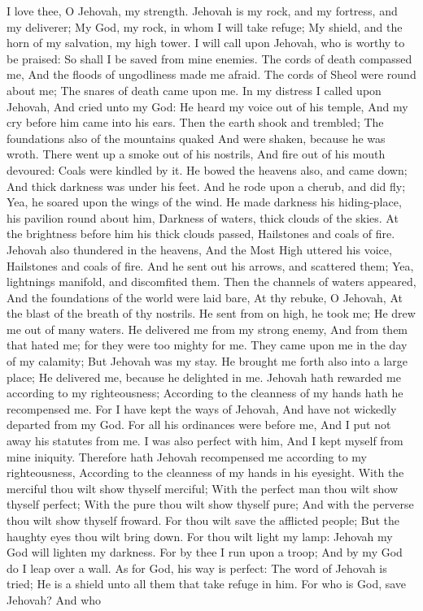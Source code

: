 I love thee, O Jehovah, my strength.  Jehovah is my rock, and my fortress, and my deliverer; My God, my rock, in whom I will take refuge; My shield, and the horn of my salvation, my high tower.  I will call upon Jehovah, who is worthy to be praised: So shall I be saved from mine enemies.  The cords of death compassed me, And the floods of ungodliness made me afraid.  The cords of Sheol were round about me; The snares of death came upon me.  In my distress I called upon Jehovah, And cried unto my God: He heard my voice out of his temple, And my cry before him came into his ears.  Then the earth shook and trembled; The foundations also of the mountains quaked And were shaken, because he was wroth.  There went up a smoke out of his nostrils, And fire out of his mouth devoured: Coals were kindled by it.  He bowed the heavens also, and came down; And thick darkness was under his feet.  And he rode upon a cherub, and did fly; Yea, he soared upon the wings of the wind.  He made darkness his hiding-place, his pavilion round about him, Darkness of waters, thick clouds of the skies.  At the brightness before him his thick clouds passed, Hailstones and coals of fire.  Jehovah also thundered in the heavens, And the Most High uttered his voice, Hailstones and coals of fire.  And he sent out his arrows, and scattered them; Yea, lightnings manifold, and discomfited them.  Then the channels of waters appeared, And the foundations of the world were laid bare, At thy rebuke, O Jehovah, At the blast of the breath of thy nostrils.  He sent from on high, he took me; He drew me out of many waters.  He delivered me from my strong enemy, And from them that hated me; for they were too mighty for me.  They came upon me in the day of my calamity; But Jehovah was my stay.  He brought me forth also into a large place; He delivered me, because he delighted in me.  Jehovah hath rewarded me according to my righteousness; According to the cleanness of my hands hath he recompensed me.  For I have kept the ways of Jehovah, And have not wickedly departed from my God.  For all his ordinances were before me, And I put not away his statutes from me.  I was also perfect with him, And I kept myself from mine iniquity.  Therefore hath Jehovah recompensed me according to my righteousness, According to the cleanness of my hands in his eyesight.  With the merciful thou wilt show thyself merciful; With the perfect man thou wilt show thyself perfect;  With the pure thou wilt show thyself pure; And with the perverse thou wilt show thyself froward.  For thou wilt save the afflicted people; But the haughty eyes thou wilt bring down.  For thou wilt light my lamp: Jehovah my God will lighten my darkness.  For by thee I run upon a troop; And by my God do I leap over a wall.  As for God, his way is perfect: The word of Jehovah is tried; He is a shield unto all them that take refuge in him.  For who is God, save Jehovah? And who 
